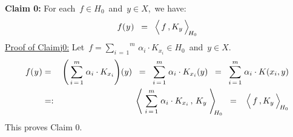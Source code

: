 \vskip 0.3cm
\noindent
\textbf{Claim 0:}\quad
For each \,$f \in H_{0}$\, and \,$y \in X$,\, we have:
\begin{equation*}
f(\overset{{\color{white}-}}{y})
\;\; = \;\;
	\left\langle\, \overset{{\color{white}.}}{f} \,, K_{y} \,\right\rangle_{\!H_{0}}
\end{equation*}
\underline{Proof of Claim{\color{white}j}0:}
\vskip0.2cm
\noindent
Let
\,$f = \overset{m}{\underset{i\,=\,1}{\sum}}\, \alpha_{i} \cdot K_{x_{i}} \in H_{0}$\,
and
\,$y \in X$.\,
\begin{eqnarray*}
f(\overset{{\color{white}-}}{y})
& = &
	\left(\,\overset{m}{\underset{i\,=\,1}{\sum}}\; \alpha_{i} \cdot K_{x_{i}}\right)\!(y)
\;\; = \;\;
	\overset{m}{\underset{i\,=\,1}{\sum}}\; \alpha_{i} \cdot K_{x_{i}}(y)
\;\; = \;\;
	\overset{m}{\underset{i\,=\,1}{\sum}}\; \alpha_{i} \cdot K(x_{i},y)
\\
& =: &
	\left\langle\;
		\overset{m}{\underset{i\,=\,1}{\sum}}\; \alpha_{i} \cdot K_{x_{i}}
		\,,\,
		K_{y}
		\;\right\rangle_{\!\!H_{0}}
\;\; = \;\;\;
	\left\langle\, \overset{{\color{white}.}}{f} \,, K_{y} \,\right\rangle_{\!H_{0}}
\end{eqnarray*}
This proves Claim 0.

